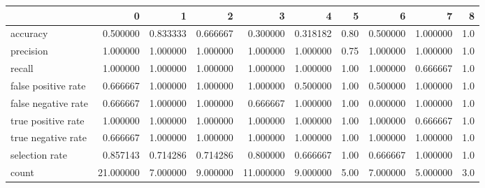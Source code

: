 \begin{tabular}{lrrrrrrrrr}
\toprule
{} &          0 &         1 &         2 &          3 &         4 &     5 &         6 &         7 &    8 \\
\midrule
accuracy            &   0.500000 &  0.833333 &  0.666667 &   0.300000 &  0.318182 &  0.80 &  0.500000 &  1.000000 &  1.0 \\
precision           &   1.000000 &  1.000000 &  1.000000 &   1.000000 &  1.000000 &  0.75 &  1.000000 &  1.000000 &  1.0 \\
recall              &   1.000000 &  1.000000 &  1.000000 &   1.000000 &  1.000000 &  1.00 &  1.000000 &  0.666667 &  1.0 \\
false positive rate &   0.666667 &  1.000000 &  1.000000 &   1.000000 &  0.500000 &  1.00 &  0.500000 &  1.000000 &  1.0 \\
false negative rate &   0.666667 &  1.000000 &  1.000000 &   0.666667 &  1.000000 &  1.00 &  0.000000 &  1.000000 &  1.0 \\
true positive rate  &   1.000000 &  1.000000 &  1.000000 &   1.000000 &  1.000000 &  1.00 &  1.000000 &  0.666667 &  1.0 \\
true negative rate  &   0.666667 &  1.000000 &  1.000000 &   1.000000 &  1.000000 &  1.00 &  1.000000 &  1.000000 &  1.0 \\
selection rate      &   0.857143 &  0.714286 &  0.714286 &   0.800000 &  0.666667 &  1.00 &  0.666667 &  1.000000 &  1.0 \\
count               &  21.000000 &  7.000000 &  9.000000 &  11.000000 &  9.000000 &  5.00 &  7.000000 &  5.000000 &  3.0 \\
\bottomrule
\end{tabular}
